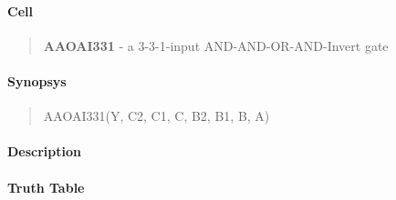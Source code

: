 \label{AAOAI331}
\paragraph{Cell}
\begin{quote}
    \textbf{AAOAI331} - a 3-3-1-input AND-AND-OR-AND-Invert gate
\end{quote}

\paragraph{Synopsys}
\begin{quote}
    AAOAI331(Y, C2, C1, C, B2, B1, B, A)
\end{quote}

\paragraph{Description}

%

\paragraph{Truth Table}
%

